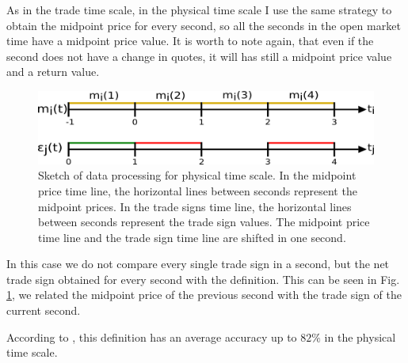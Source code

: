 As in the trade time scale, in the physical time scale I use the same strategy
to obtain the midpoint price for every second, so all the seconds in the open
market time have a midpoint price value. It is worth to note again, that even
if the second does not have a change in quotes, it will has still a midpoint
price value and a return value.

\begin{figure}[htbp]
    \centering
    \includegraphics[width=\columnwidth]
    {figures/02_relation_trades_quotes_time_scale.png}
    \caption{Sketch of data processing for physical time scale. In the midpoint
             price time line, the horizontal lines between seconds represent
             the midpoint prices. In the trade signs time line, the horizontal
             lines between seconds represent the trade sign values. The
             midpoint price time line and the trade sign time line are shifted
             in one second.}
    \label{fig:relation_trades_midpoint_time_scale}
\end{figure}

In this case we do not compare every single trade sign in a second, but the net
trade sign obtained for every second with the definition. This can be seen in
Fig. \ref{fig:relation_trades_midpoint_time_scale}, we related the midpoint
price of the previous second with the trade sign of the current second.

According to \cite{Wang_2016_cross}, this definition has an average
accuracy up to $82\%$ in the physical time scale.